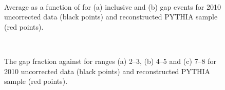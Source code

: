 \begin{figure}
\centering
\mbox{
              \quad
              \quad
                              }
\caption[]{
Average \costwodphi{} as a function of \dy{} for (a) inclusive and (b) gap events for 2010 uncorrected data (black points) and reconstructed PYTHIA sample (red points).
\label{GBJ2:Uncorr:cos2}}
\end{figure}

\begin{figure}
\centering
\mbox{
      \quad
      \quad
}
\mbox{
      \quad
}
\caption[]{
The gap fraction against \qz{} for \dy{} ranges (a) 2--3, (b) 4--5 and (c) 7--8 for 2010 uncorrected data (black points) and reconstructed PYTHIA sample (red points).
\label{GBJ2:Uncorr:Q0}}
\end{figure}


